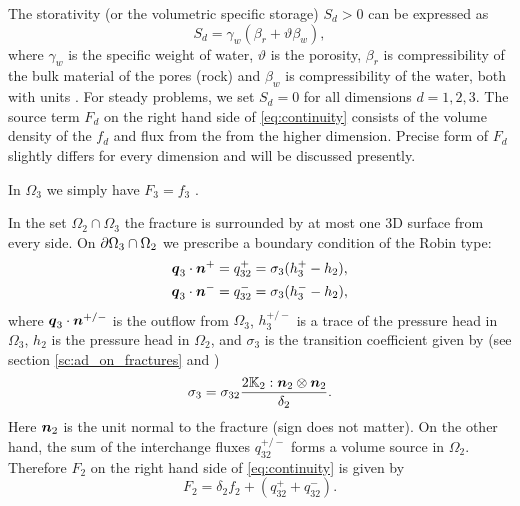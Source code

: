 The storativity (or the volumetric specific storage) $S_d>0$ can be expressed as
\begin{equation}
  S_d = \gamma_w(\beta_r + \vartheta \beta_w),
\end{equation}
where $\gamma_w$  is the specific weight of water, $\vartheta$ \units{}{}{} is the porosity,
$\beta_r$ is compressibility of the bulk material of the pores (rock)
and $\beta_w$ is compressibility of the water, both with units . For steady problems, we set $S_d=0$ for all dimensions $d=1,2,3$.
The source term $F_d$ on the right hand side of \eqref{eq:continuity} consists of the volume density of the 
 $f_d$ and flux from the from the higher dimension. 
Precise form of $F_d$ slightly differs for every dimension and will be discussed presently.

In $\Omega_3$ we simply have $F_3  = f_3$ .

In the set $\Omega_2 \cap \Omega_3$ the fracture is surrounded by at most one 3D surface from every side.
On $\partial\Omega_3 \cap \Omega_2$ we prescribe a boundary condition of the Robin type:
\begin{align*}
        \mathbf{\boldsymbol{q}}_3\cdot \mathbf{\boldsymbol{n}}^{+} &= q_{32}^{+} =\sigma_{3} (h_3^{+}-h_2),\\
        \mathbf{\boldsymbol{q}}_3\cdot \mathbf{\boldsymbol{n}}^{-} &= q_{32}^{-} =\sigma_{3} (h_3^{-}-h_2),
\end{align*}
where $\mathbf{\boldsymbol{q}}_3\cdot\mathbf{\boldsymbol{n}}^{+/-}$  is the outflow from $\Omega_3$, $h_3^{+/-}$ is
a trace of the pressure head in $\Omega_3$, $h_2$ is the pressure head in $\Omega_2$, and 
$\sigma_{3}$  is the transition coefficient given by (see section \ref{sc:ad_on_fractures} and \cite{martin_modeling_2005})
\[
\label{e:sigma3_law}
  \sigma_3 = \sigma_{32} \frac{2\tn K_2 :\vc n_2\otimes\vc n_2 }{\delta_2}.
\]
Here $\mathbf{\boldsymbol{n}}_2$ is the unit normal to the fracture (sign does not matter).
On the other hand, the sum of the interchange fluxes $q_{32}^{+/-}$ forms
a volume source in $\Omega_2$.  Therefore $F_2$  on the right hand side of \eqref{eq:continuity} is
given by
\begin{equation}
   \label{source_2D}
   F_2 = \delta_2 f_2 + (q_{32}^{+} + q_{32}^{-}).
\end{equation}

